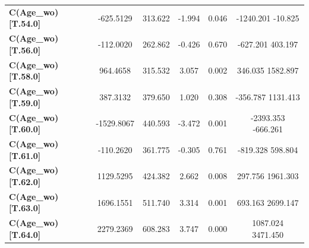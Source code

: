 \begin{subappendices}
\begin{table}[H]
{\begin{tabular}{lccccc}
\textbf{C(Age_wo)[T.54.0]}                                           &    -625.5129  &      313.622     &    -1.994  &         0.046        &     -1240.201   -10.825       \\
\textbf{C(Age_wo)[T.56.0]}                                           &    -112.0020  &      262.862     &    -0.426  &         0.670        &      -627.201   403.197       \\
\textbf{C(Age_wo)[T.58.0]}                                           &     964.4658  &      315.532     &     3.057  &         0.002        &       346.035  1582.897       \\
\textbf{C(Age_wo)[T.59.0]}                                           &     387.3132  &      379.650     &     1.020  &         0.308        &      -356.787  1131.413       \\
\textbf{C(Age_wo)[T.60.0]}                                           &   -1529.8067  &      440.593     &    -3.472  &         0.001        &     -2393.353  -666.261       \\
\textbf{C(Age_wo)[T.61.0]}                                           &    -110.2620  &      361.775     &    -0.305  &         0.761        &      -819.328   598.804       \\
\textbf{C(Age_wo)[T.62.0]}                                           &    1129.5295  &      424.382     &     2.662  &         0.008        &       297.756  1961.303       \\
\textbf{C(Age_wo)[T.63.0]}                                           &    1696.1551  &      511.740     &     3.314  &         0.001        &       693.163  2699.147       \\
\textbf{C(Age_wo)[T.64.0]}                                           &    2279.2369  &      608.283     &     3.747  &         0.000        &      1087.024  3471.450       \\

\end{tabular}}
\end{table}
\end{subappendices}
